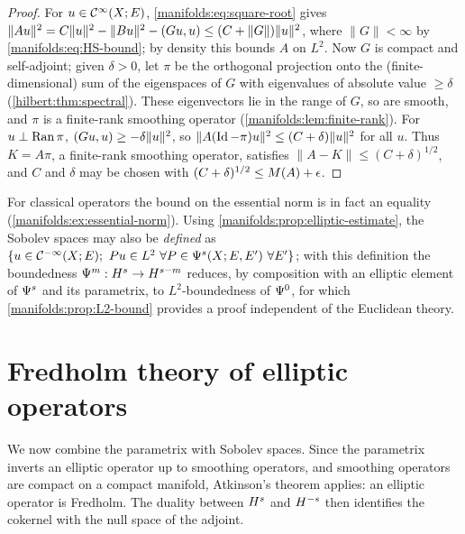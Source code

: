 \begin{proof}
For $u\in\mathcal{C}^\infty(X;E)$, \eqref{manifolds:eq:square-root} gives
$\|Au\|^2=C\|u\|^2-\|Bu\|^2-( Gu, u)\le(C+\|G\|)\|u\|^2$, where $\|G\|<\infty$ by
\eqref{manifolds:eq:HS-bound}; by density this bounds $A$ on $L^2$. Now $G$ is compact
and self-adjoint; given $\delta>0$, let $\pi$ be the orthogonal projection onto the
(finite-dimensional) sum of the eigenspaces of $G$ with eigenvalues of absolute value
$\ge\delta$ (\cref{hilbert:thm:spectral}). These eigenvectors lie in the range of $G$,
so are smooth, and $\pi$ is a finite-rank smoothing operator
(\cref{manifolds:lem:finite-rank}). For $u\perp\operatorname{Ran}\pi$, $( Gu, u)\ge-\delta\|u\|^2$, so
$\|A(\operatorname{Id}-\pi)u\|^2\le(C+\delta)\|u\|^2$ for all $u$. Thus $K=A\pi$, a finite-rank smoothing
operator, satisfies $\|A-K\|\le(C+\delta)^{1/2}$, and $C$ and $\delta$ may be chosen with
$(C+\delta)^{1/2}\le M(A)+\epsilon$.
\end{proof}

For classical operators the bound on the essential norm is in fact an equality
(\cref{manifolds:ex:essential-norm}). Using
\cref{manifolds:prop:elliptic-estimate}, the Sobolev spaces may also be
\emph{defined} as $\{u\in\mathcal{C}^{-\infty}(X;E);\ Pu\in L^2\ \forall P\in\Psi^{s}(X;E,E')\
\forall E'\}$; with this definition the boundedness $\Psi^{m}:H^{s}\to H^{s-m}$ reduces,
by composition with an elliptic element of $\Psi^{s}$ and its parametrix, to
$L^2$-boundedness of $\Psi^{0}$, for which \cref{manifolds:prop:L2-bound} provides a
proof independent of the Euclidean theory.

\section{Fredholm theory of elliptic operators}\label{manifolds:sec:fredholm}
We now combine the parametrix with Sobolev spaces. Since the parametrix
inverts an elliptic operator up to smoothing operators, and smoothing
operators are compact on a compact manifold, Atkinson's theorem applies: an
elliptic operator is Fredholm. The duality between $H^{s}$ and $H^{-s}$ then
identifies the cokernel with the null space of the adjoint.

